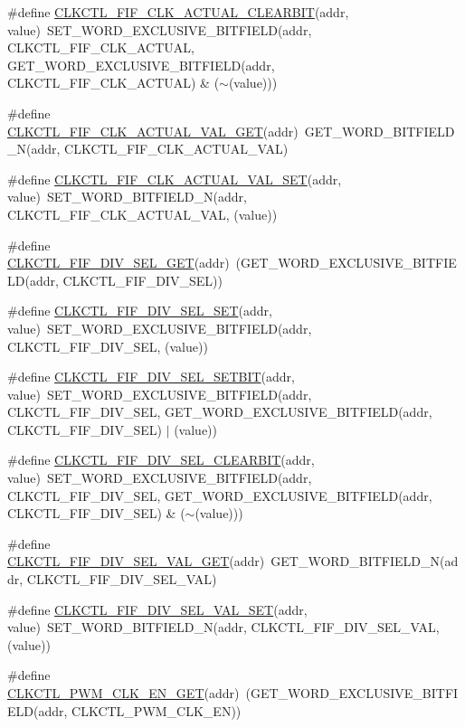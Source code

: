 \begin{DoxyCompactItemize}
\item 
\#define \hyperlink{a00544_a11d660b9f9b206edd2041245304a37a1}{CLKCTL\_\-FIF\_\-CLK\_\-ACTUAL\_\-CLEARBIT}(addr, value)~SET\_\-WORD\_\-EXCLUSIVE\_\-BITFIELD(addr, CLKCTL\_\-FIF\_\-CLK\_\-ACTUAL, GET\_\-WORD\_\-EXCLUSIVE\_\-BITFIELD(addr, CLKCTL\_\-FIF\_\-CLK\_\-ACTUAL) \& ($\sim$(value)))
\item 
\#define \hyperlink{a00544_a49d6e2f4f4bc323079b36dfa8193f1fa}{CLKCTL\_\-FIF\_\-CLK\_\-ACTUAL\_\-VAL\_\-GET}(addr)~GET\_\-WORD\_\-BITFIELD\_\-N(addr, CLKCTL\_\-FIF\_\-CLK\_\-ACTUAL\_\-VAL)
\item 
\#define \hyperlink{a00544_afdce278e427e2e699963d0b9d53c6bac}{CLKCTL\_\-FIF\_\-CLK\_\-ACTUAL\_\-VAL\_\-SET}(addr, value)~SET\_\-WORD\_\-BITFIELD\_\-N(addr, CLKCTL\_\-FIF\_\-CLK\_\-ACTUAL\_\-VAL, (value))
\item 
\#define \hyperlink{a00544_a2847c0f1d102afe8ed6afdffe58a67cc}{CLKCTL\_\-FIF\_\-DIV\_\-SEL\_\-GET}(addr)~(GET\_\-WORD\_\-EXCLUSIVE\_\-BITFIELD(addr, CLKCTL\_\-FIF\_\-DIV\_\-SEL))
\item 
\#define \hyperlink{a00544_afe869b85d8e56538cf2a46828a2f8482}{CLKCTL\_\-FIF\_\-DIV\_\-SEL\_\-SET}(addr, value)~SET\_\-WORD\_\-EXCLUSIVE\_\-BITFIELD(addr, CLKCTL\_\-FIF\_\-DIV\_\-SEL, (value))
\item 
\#define \hyperlink{a00544_a8d4114ef9acd20d9c3a644499ec84de2}{CLKCTL\_\-FIF\_\-DIV\_\-SEL\_\-SETBIT}(addr, value)~SET\_\-WORD\_\-EXCLUSIVE\_\-BITFIELD(addr, CLKCTL\_\-FIF\_\-DIV\_\-SEL, GET\_\-WORD\_\-EXCLUSIVE\_\-BITFIELD(addr, CLKCTL\_\-FIF\_\-DIV\_\-SEL) $|$ (value))
\item 
\#define \hyperlink{a00544_a4d2cacd77d5e65bf66bddc11832cc105}{CLKCTL\_\-FIF\_\-DIV\_\-SEL\_\-CLEARBIT}(addr, value)~SET\_\-WORD\_\-EXCLUSIVE\_\-BITFIELD(addr, CLKCTL\_\-FIF\_\-DIV\_\-SEL, GET\_\-WORD\_\-EXCLUSIVE\_\-BITFIELD(addr, CLKCTL\_\-FIF\_\-DIV\_\-SEL) \& ($\sim$(value)))
\item 
\#define \hyperlink{a00544_ae3fe76f20e396ecc1f069864b451ecc3}{CLKCTL\_\-FIF\_\-DIV\_\-SEL\_\-VAL\_\-GET}(addr)~GET\_\-WORD\_\-BITFIELD\_\-N(addr, CLKCTL\_\-FIF\_\-DIV\_\-SEL\_\-VAL)
\item 
\#define \hyperlink{a00544_a310c43298b584d47b4ba76f7bb1d86cd}{CLKCTL\_\-FIF\_\-DIV\_\-SEL\_\-VAL\_\-SET}(addr, value)~SET\_\-WORD\_\-BITFIELD\_\-N(addr, CLKCTL\_\-FIF\_\-DIV\_\-SEL\_\-VAL, (value))
\item 
\#define \hyperlink{a00544_a9aba5b3e239995de0860092dd4b4f64a}{CLKCTL\_\-PWM\_\-CLK\_\-EN\_\-GET}(addr)~(GET\_\-WORD\_\-EXCLUSIVE\_\-BITFIELD(addr, CLKCTL\_\-PWM\_\-CLK\_\-EN))

\end{DoxyCompactItemize}

